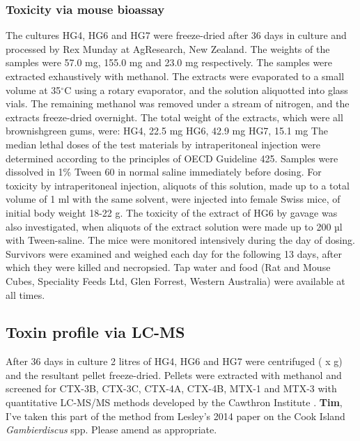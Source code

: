 \documentclass[12pt]{article}
\begin{document}
\subsubsection{Toxicity via mouse bioassay}
The cultures HG4, HG6 and HG7 were freeze-dried after 36 days in culture and processed by Rex Munday at AgResearch, New Zealand. The weights of the samples were 57.0 mg, 155.0 mg and 23.0 mg respectively. The samples were extracted exhaustively with methanol. The extracts were evaporated to a small volume at 35$^{\circ}$C using a rotary evaporator, and the solution aliquotted into glass vials. The remaining methanol was removed under a stream of nitrogen, and the extracts freeze-dried overnight. The total weight of the extracts, which were all brownishgreen gums, were: HG4, 22.5 mg HG6, 42.9 mg HG7, 15.1 mg The median lethal doses of the test materials by intraperitoneal injection were determined according to the principles of OECD Guideline 425. Samples were dissolved in 1\% Tween 60 in normal saline immediately before dosing. For toxicity by intraperitoneal injection, aliquots of this solution, made up to a total volume of 1 ml with the same solvent, were injected into female Swiss mice, of initial body weight 18-22 g. The toxicity of the extract of HG6 by gavage was also investigated, when aliquots of the extract solution were made up to 200 µl with Tween-saline. The mice were monitored intensively during the day of dosing. Survivors were examined and weighed each day for the following 13 days, after which they were killed and necropsied. Tap water and food (Rat and Mouse Cubes, Speciality Feeds Ltd, Glen Forrest, Western Australia) were available at all times.

\subsection{Toxin profile via LC-MS}
After 36 days in culture 2 litres of HG4, HG6 and HG7 were centrifuged (  x g) and the resultant pellet freeze-dried. Pellets were extracted with methanol and screened for CTX-3B, CTX-3C, CTX-4A, CTX-4B, MTX-1 and MTX-3 with quantitative LC-MS/MS methods developed by the Cawthron Institute \cite{kohli2014feeding}.
\textbf{Tim}, I've taken this part of the method from Lesley's 2014 paper on the Cook Island \emph{Gambierdiscus} spp. Please amend as appropriate. 

\newpage
\end{document}
